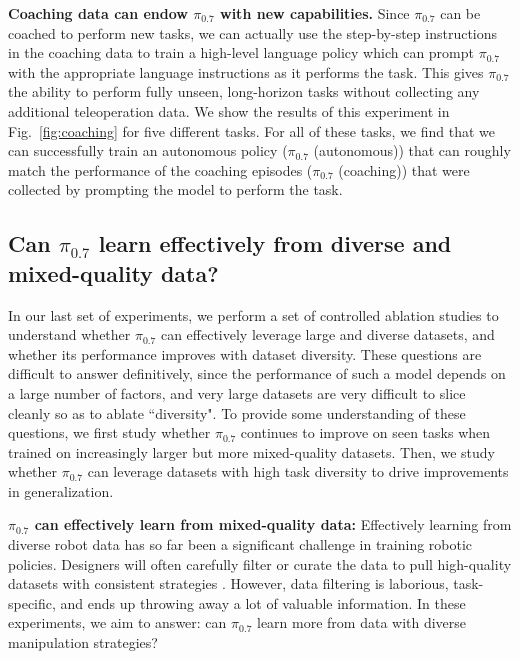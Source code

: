 \documentclass[conference]{IEEEtran}
\def \MethodName {$\pi_{0.7}$}
\begin{document}
\noindent \textbf{Coaching data can endow \MethodName{} with new capabilities. }
Since \MethodName{} can be coached to perform new tasks, we can actually use the step-by-step instructions in the coaching data to train a high-level language policy which can prompt \MethodName{} with the appropriate language instructions as it performs the task. This gives \MethodName{} the ability to perform fully unseen, long-horizon tasks without collecting any additional teleoperation data. We show the results of this experiment in Fig.~\ref{fig:coaching} for five different tasks. For all of these tasks, we find that we can successfully train an autonomous policy (\MethodName{} (autonomous)) that can roughly match the performance of the coaching episodes (\MethodName{} (coaching)) that were collected by prompting the model to perform the task.



\subsection{Can \texorpdfstring{\MethodName{}}{pi0.7} learn effectively from diverse and mixed-quality data?}
\label{sec:scaling}
In our last set of experiments, we perform a set of controlled ablation studies to understand whether \MethodName{} can effectively leverage large and diverse datasets, and whether its performance improves with dataset diversity. These questions are difficult to answer definitively, since the performance of such a model depends on a large number of factors, and very large datasets are very difficult to slice cleanly so as to ablate ``diversity". To provide some understanding of these questions, we first study whether \MethodName{} continues to improve on seen tasks when trained on increasingly larger but more mixed-quality datasets. Then, we study whether \MethodName{} can leverage datasets with high task diversity to drive improvements in generalization.

\noindent \textbf{\MethodName{} can effectively learn from mixed-quality data: }
Effectively learning from diverse robot data has so far been a significant challenge in training robotic policies. Designers will often carefully filter or curate the data to pull high-quality datasets with consistent strategies \cite{hejna2025robot, li2025gr}. However, data filtering is laborious, task-specific, and ends up throwing away a lot of valuable information. In these experiments, we aim to answer: can \MethodName{} learn more from data with diverse manipulation strategies?
\end{document}
